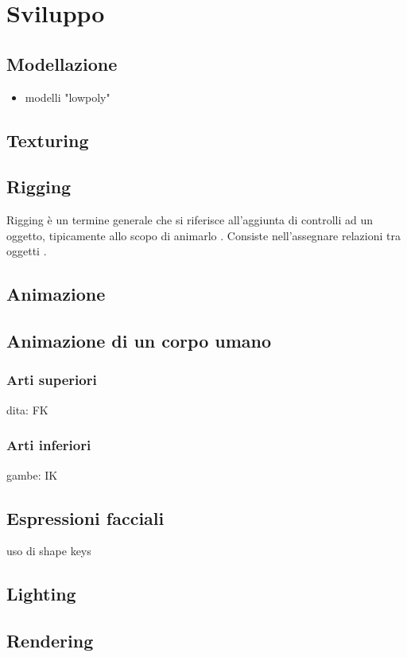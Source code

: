 
\chapter{Sviluppo} %

\label{Chapter5} %


\section{Modellazione}
\begin{itemize}
    \item modelli "lowpoly"
\end{itemize}
\section{Texturing}
\section{Rigging}
Rigging è un termine generale che si riferisce all'aggiunta di controlli ad un oggetto, tipicamente allo scopo di animarlo \parencite{blendDoc}.
Consiste nell'assegnare relazioni tra oggetti \parencite{BlendTut}.
\section{Animazione}
\section{Animazione di un corpo umano}
\subsection{Arti superiori}
dita: FK
\subsection{Arti inferiori}
gambe: IK
\section{Espressioni facciali}
uso di shape keys
\section{Lighting}
\section{Rendering}


